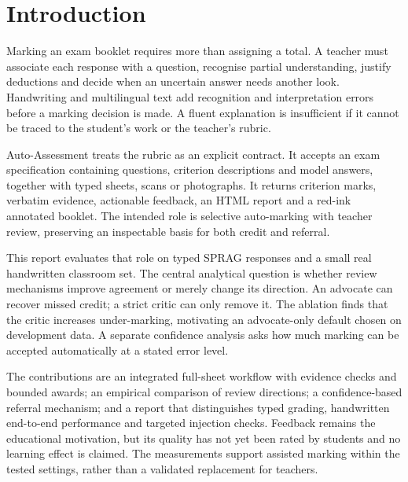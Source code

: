 \section{Introduction}
Marking an exam booklet requires more than assigning a total. A teacher must associate each response with a question, recognise partial understanding, justify deductions and decide when an uncertain answer needs another look. Handwriting and multilingual text add recognition and interpretation errors before a marking decision is made. A fluent explanation is insufficient if it cannot be traced to the student's work or the teacher's rubric.

Auto-Assessment treats the rubric as an explicit contract. It accepts an exam specification containing questions, criterion descriptions and model answers, together with typed sheets, scans or photographs. It returns criterion marks, verbatim evidence, actionable feedback, an HTML report and a red-ink annotated booklet. The intended role is selective auto-marking with teacher review, preserving an inspectable basis for both credit and referral.

This report evaluates that role on typed SPRAG responses and a small real handwritten classroom set. The central analytical question is whether review mechanisms improve agreement or merely change its direction. An advocate can recover missed credit; a strict critic can only remove it. The ablation finds that the critic increases under-marking, motivating an advocate-only default chosen on development data. A separate confidence analysis asks how much marking can be accepted automatically at a stated error level.

The contributions are an integrated full-sheet workflow with evidence checks and bounded awards; an empirical comparison of review directions; a confidence-based referral mechanism; and a report that distinguishes typed grading, handwritten end-to-end performance and targeted injection checks. Feedback remains the educational motivation, but its quality has not yet been rated by students and no learning effect is claimed. The measurements support assisted marking within the tested settings, rather than a validated replacement for teachers.
